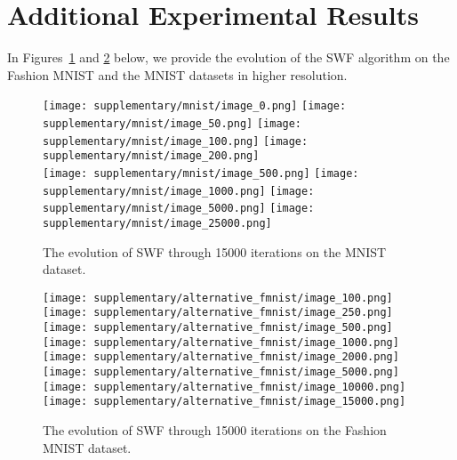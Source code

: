 


\section{Additional Experimental Results}

In Figures~\ref{fig:suppmnist} and \ref{fig:suppfmnist} below, we provide the evolution of the SWF algorithm on the Fashion MNIST and the MNIST datasets in higher resolution.

\newcommand{\picwidth}{0.15}%

\begin{figure}
\centering
\texttt{[image: supplementary/mnist/image\_0.png]}
\texttt{[image: supplementary/mnist/image\_50.png]}
\texttt{[image: supplementary/mnist/image\_100.png]}
\texttt{[image: supplementary/mnist/image\_200.png]}\\
\texttt{[image: supplementary/mnist/image\_500.png]}
\texttt{[image: supplementary/mnist/image\_1000.png]}
\texttt{[image: supplementary/mnist/image\_5000.png]}
\texttt{[image: supplementary/mnist/image\_25000.png]}
\caption{The evolution of SWF through 15000 iterations on the MNIST dataset.}
\label{fig:suppmnist}
\end{figure}

\begin{figure}
\centering
\texttt{[image: supplementary/alternative\_fmnist/image\_100.png]}
\texttt{[image: supplementary/alternative\_fmnist/image\_250.png]}
\texttt{[image: supplementary/alternative\_fmnist/image\_500.png]}
\texttt{[image: supplementary/alternative\_fmnist/image\_1000.png]}\\
\texttt{[image: supplementary/alternative\_fmnist/image\_2000.png]}
\texttt{[image: supplementary/alternative\_fmnist/image\_5000.png]}
\texttt{[image: supplementary/alternative\_fmnist/image\_10000.png]}
\texttt{[image: supplementary/alternative\_fmnist/image\_15000.png]}
\caption{The evolution of SWF through 15000 iterations on the Fashion MNIST dataset.}
\label{fig:suppfmnist}
\end{figure}







